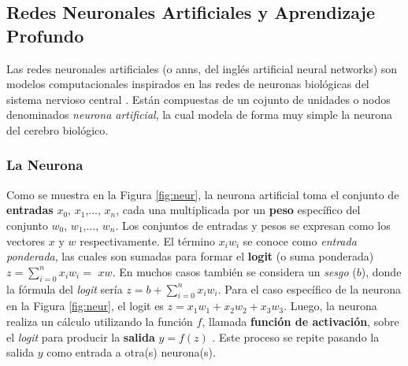 \subsection{Redes Neuronales Artificiales y Aprendizaje Profundo}
%
Las redes neuronales artificiales (o \acrshort{ann}s, del inglés artificial neural networks) son modelos computacionales inspirados en las redes de neuronas biológicas del sistema nervioso central \cite{Graupe}. Están compuestas de un cojunto de unidades o nodos denominados \textit{neurona artificial}, la cual modela de forma muy simple la neurona del cerebro biológico. 
%
%
%
%
%
%
%
%
\subsubsection{La Neurona}

Como se muestra en la Figura \ref{fig:neur}, la neurona artificial toma el conjunto de \textbf{entradas} $x_0$, $x_1$,..., $x_n$, cada una multiplicada por un \textbf{peso} específico del conjunto $w_0$, $w_1$,..., $w_n$. Los conjuntos de entradas y pesos se expresan como los vectores \textbf{$x$} y \textbf{$w$} respectivamente. El término $x_i w_i$ se conoce como \textit{entrada ponderada}, las cuales son sumadas para formar el \textbf{logit} (o suma ponderada) $z = \sum_{i=0}^n {x_i w_i} = $ \textbf{$x w$}. En muchos casos también se considera un \textit{sesgo} ($b$), donde la fórmula del \emph{logit} sería $z = b + \sum_{i=0}^n {x_i w_i}$. Para el caso específico de la neurona en la Figura \ref{fig:neur}, el logit es $z = x_1 w_1 + x_2 w_2 + x_3 w_3$. Luego, la neurona realiza un cálculo utilizando la función $f$, llamada \textbf{función de activación}, sobre el \emph{logit} para producir la \textbf{salida} $y = f(z)$ \cite{Bishop}. Este proceso se repite pasando la salida $y$ como entrada a otra(s) neurona(s).


